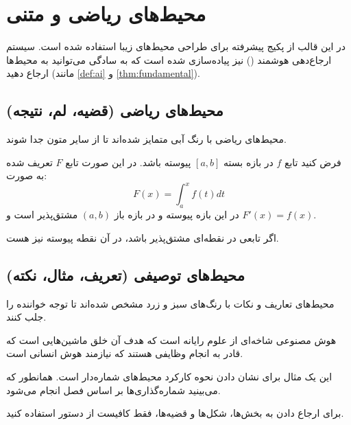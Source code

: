 \chapter{محیط‌های ریاضی و متنی}
\label{chap:envs}

در این قالب از پکیج پیشرفته  برای طراحی محیط‌های زیبا استفاده شده است. سیستم ارجاع‌دهی هوشمند () نیز پیاده‌سازی شده است که به سادگی می‌توانید به محیط‌ها ارجاع دهید (مانند \cref{def:ai} و \cref{thm:fundamental}).

\section{محیط‌های ریاضی (قضیه، لم، نتیجه)}
محیط‌های ریاضی با رنگ آبی متمایز شده‌اند تا از سایر متون جدا شوند.

\begin{theorem}
\label{thm:fundamental}
فرض کنید تابع $f$ در بازه بسته $[a,b]$ پیوسته باشد. در این صورت تابع $F$ تعریف شده به صورت:
\[ F(x) = \int_a^x f(t) dt \]
در این بازه پیوسته و در بازه باز $(a,b)$ مشتق‌پذیر است و $F'(x) = f(x)$.
\end{theorem}

\begin{lemma}
\label{lem:sample}
اگر تابعی در نقطه‌ای مشتق‌پذیر باشد، در آن نقطه پیوسته نیز هست.
\end{lemma}

\section{محیط‌های توصیفی (تعریف، مثال، نکته)}
محیط‌های تعاریف و نکات با رنگ‌های سبز و زرد مشخص شده‌اند تا توجه خواننده را جلب کنند.

\begin{definition}
\label{def:ai}
هوش مصنوعی  شاخه‌ای از علوم رایانه است که هدف آن خلق ماشین‌هایی است که قادر به انجام وظایفی هستند که نیازمند هوش انسانی است.
\end{definition}

\begin{example}
\label{ex:sample}
این یک مثال برای نشان دادن نحوه کارکرد محیط‌های شماره‌دار است. همانطور که می‌بینید شماره‌گذاری‌ها بر اساس فصل انجام می‌شود.
\end{example}

\begin{note}
برای ارجاع دادن به بخش‌ها، شکل‌ها و قضیه‌ها، فقط کافیست از دستور  استفاده کنید.
\end{note}


